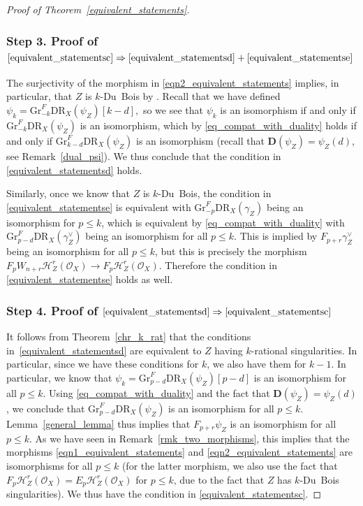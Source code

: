 \documentclass[11pt]{article}
\numberwithin{equation}{section}
\theoremstyle{plain}
\theoremstyle{definition}
\newcommand\cH{\mathcal{H}}
\newcommand\cO{\mathcal{O}}
\newcommand\cH{\mathcal{H}}
\newcommand\cO{\mathcal{O}}
\newcommand\gr{\mathrm{Gr}}
\newcommand\DR{\mathrm{DR}}
\begin{document}
\begin{proof}[Proof of Theorem~\ref{equivalent_statements}]
\subsubsection*{Step 3. Proof of $\eqref{equivalent_statementsc}\Rightarrow\eqref{equivalent_statementsd}+\eqref{equivalent_statementse}$}
The surjectivity of the morphism in
\eqref{eqn2_equivalent_statements} implies, in particular, that $Z$ is $k$-Du~Bois by \cite[Th.\,F]{MP1}.
Recall that we have defined $\psi_k=\gr^F_{-k}\DR_X(\psi_Z)[k-d],$ so we see that $\psi_k$ is an isomorphism if and only if
$\gr^F_{-k}\DR_X(\psi_Z)$ is an isomorphism, which by \eqref{eq_compat_with_duality} holds if
and only if $\gr^F_{k-d}\DR_X(\psi_Z)$ is an isomorphism (recall that ${\mathbf D}(\psi_Z)=\psi_Z(d)$, see Remark~\ref{dual_psi}).
We thus conclude that the condition in \eqref{equivalent_statementsd} holds.

Similarly, once we know that $Z$ is $k$-Du~Bois, the condition in \eqref{equivalent_statementse} is equivalent with $\gr^F_{-p}\DR_X(\gamma_Z)$ being
an isomorphism for $p\leq k$, which is equivalent by \eqref{eq_compat_with_duality} with $\gr^F_{p-d}\DR_X(\gamma_Z^{\vee})$
being an isomorphism for all $p\leq k$. This is implied by $F_{p+r}\gamma_Z^{\vee}$ being an isomorphism for all $p\leq k$, but this is precisely
the morphism $F_pW_{n+r}\cH^r_Z(\cO_X)\to F_p\cH^r_Z(\cO_X)$. Therefore the condition in \eqref{equivalent_statementse} holds as well.

\subsubsection*{Step 4. Proof of $\eqref{equivalent_statementsd}\Rightarrow\eqref{equivalent_statementsc}$}
It follows from Theorem~\ref{chr_k_rat} that the conditions in~\eqref{equivalent_statementsd} are equivalent to $Z$ having $k$-rational singularities. In particular,
since we have these conditions for $k$, we also have them for $k-1$. In particular, we know that
$\psi_k=\gr^F_{p-d}\DR_X(\psi_Z)[p-d]$ is an isomorphism for all $p\leq k$. Using \eqref{eq_compat_with_duality} and the fact that
${\mathbf D}(\psi_Z)=\psi_Z(d)$, we conclude that $\gr^F_{p-d}\DR_X(\psi_Z)$ is an isomorphism for all $p\leq k$.
Lemma~\ref{general_lemma} thus implies that $F_{p+r}\psi_Z$ is an isomorphism for all $p\leq k$. As we have seen in
Remark~\ref{rmk_two_morphisms}, this implies that the morphisms \eqref{eqn1_equivalent_statements} and \eqref{eqn2_equivalent_statements}
are isomorphisms for all $p\leq k$ (for the latter morphism, we also use the fact that $F_p\cH_Z^r(\cO_X)=E_p\cH^r_Z(\cO_X)$ for $p\leq k$,
due to the fact that $Z$ has $k$-Du~Bois singularities). We thus have the condition in \eqref{equivalent_statementsc}.


\end{proof}
\end{document}
